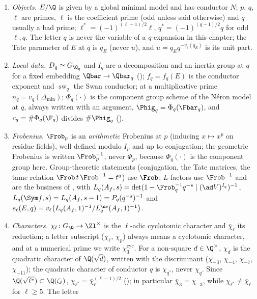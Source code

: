 \begin{convention}\label{conv:galrep:notation}
\begin{enumerate}[label=(\alph*)]
\item \emph{Objects.} $E/\Q$ is given by a global minimal model and has conductor $N$; $p$, $q$, $\ell$ are primes, $\ell$ is the coefficient
prime (odd unless said otherwise) and $q$ usually a bad prime; $\ell^*=(-1)^{(\ell-1)/2}\ell$, $q^*=(-1)^{(q-1)/2}q$ for odd $\ell,q$. The letter $q$ is
never the variable of a $q$-expansion in this chapter; the Tate parameter of $E$ at $q$ is $q_E$ (never $u$), and $u=q_Eq^{-v_q(q_E)}$ is its unit
part.
\item \emph{Local data.} $D_q\simeq G_{\Q_q}$ and $I_q$ are a decomposition and an inertia group at $q$ for a fixed embedding $\Qbar\to\Qbar_q$
(); $f_q=f_q(E)$ is the conductor exponent and $\operatorname{sw}_q$ the Swan conductor; at a multiplicative prime $n_q=v_q(\Delta_{\min})$;
$\Phi_q(\cdot)$ is the component group scheme of the N\'eron model at $q$, always written with an argument, $\Phig_q=\Phi_q(\Fbar_q)$, and
$c_q=\#\Phi_q(\F_q)$ divides $\#\Phig_q$ ().
\item \emph{Frobenius.} $\Frob_p$ is an \emph{arithmetic} Frobenius at $p$ (inducing $x\mapsto x^p$ on residue fields), well defined modulo $I_p$
and up to conjugation; the geometric Frobenius is written $\Frob_p^{-1}$, never $\Phi_p$, because $\Phi_q(\cdot)$ is the component group here.
Group-theoretic statements (conjugation, the Tate matrices, the tame relation $\Frob\,t\,\Frob^{-1}=t^q$) use $\Frob$; $L$-factors use
$\Frob^{-1}$ and are the business of , with $L_q(A_f,s)=\det(1-\Frob_q^{-1}q^{-s}\mid(\ad V)^{I_q})^{-1}$,
$L_q(\Sym f,s)=L_q(A_f,s-1)=P_q(q^{-s})^{-1}$ and $e_\ell(E,q)=v_\ell\bigl(L_q(A_f,1)^{-1}/L^{\nv}_q(A_f,1)^{-1}\bigr)$.
\item \emph{Characters.} $\chi_\ell\colon G_\Q\to\Zl^\times$ is the $\ell$-adic cyclotomic character and $\bar\chi_\ell$ its reduction; a letter
subscript ($\chi_\ell$, $\chi_p$) always means a cyclotomic character, and at a numerical prime we write $\chi_3^{\mathrm{cyc}}$. For a non-square
$d\in\Q^\times$, $\chi_d$ is the quadratic character of $\Q(\sqrt d)$, written with the discriminant ($\chi_{-3}$, $\chi_{-4}$, $\chi_{-7}$,
$\chi_{-11}$); the quadratic character of conductor $q$ is $\chi_{q^*}$, never $\chi_q$. Since $\Q(\sqrt{\ell^*})\subset\Q(\zeta_\ell)$,
$\chi_{\ell^*}=\bar\chi_\ell^{(\ell-1)/2}$ (); in particular $\bar\chi_3=\chi_{-3}$, while $\chi_{\ell^*}\ne\bar\chi_\ell$ for $\ell\ge5$. The letter

\end{enumerate}
\end{convention}
